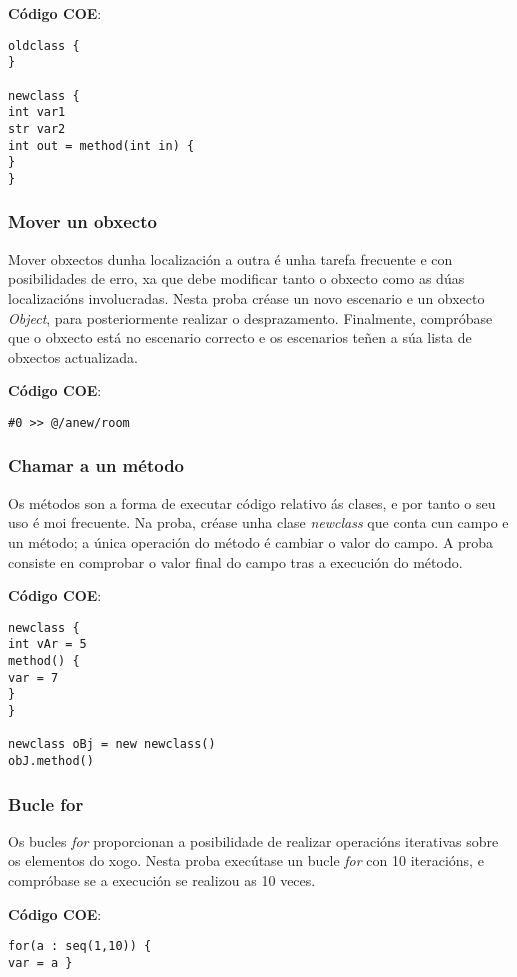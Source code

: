 \textbf{Código COE}:
\begin{lstlisting}
oldclass {
}

newclass {
int var1
str var2
int out = method(int in) {
}
}
\end{lstlisting}

\subsubsection{Mover un obxecto}
Mover obxectos dunha localización a outra é unha tarefa frecuente e con
posibilidades de erro, xa que debe modificar tanto o obxecto como as dúas
localizacións involucradas. Nesta proba créase un novo escenario e un obxecto
\textit{Object}, para posteriormente realizar o desprazamento. Finalmente,
compróbase que o obxecto está no escenario correcto e os escenarios teñen a súa
lista de obxectos actualizada.

\textbf{Código COE}:
\begin{lstlisting}
#0 >> @/anew/room
\end{lstlisting}

\subsubsection{Chamar a un método}
Os métodos son a forma de executar código relativo ás clases, e por tanto o seu
uso é moi frecuente. Na proba, créase unha clase \textit{newclass} que conta cun
campo e un método; a única operación do método é cambiar o valor do campo. A
proba consiste en comprobar o valor final do campo tras a execución do método.

\textbf{Código COE}:
\begin{lstlisting}
newclass {
int vAr = 5
method() {
var = 7
}
}

newclass oBj = new newclass()
obJ.method()
\end{lstlisting}

\subsubsection{Bucle for}
Os bucles \textit{for} proporcionan a posibilidade de realizar operacións
iterativas sobre os elementos do xogo. Nesta proba execútase un bucle
\textit{for} con 10 iteracións, e compróbase se a execución se realizou as 10
veces.

\textbf{Código COE}:
\begin{lstlisting}
for(a : seq(1,10)) {
var = a }
\end{lstlisting}

